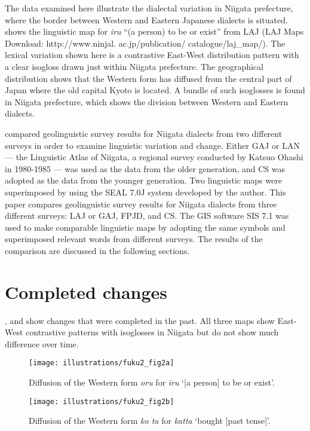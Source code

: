 \documentclass[output=paper]{LSP/langsci}
\begin{document}
The data examined here illustrate the dialectal variation in Niigata prefecture, where the border between Western and Eastern Japanese dialects is situated.   shows the linguistic map for \textit{iru} “(a person) to be or exist” from LAJ (LAJ Maps Download: http://www.ninjal. ac.jp/publication/ catalogue/laj\_map/).  The lexical variation shown here is a contrastive East-West distribution pattern with a clear isogloss drawn just within Niigata prefecture.  The geographical distribution shows that the Western form has diffused from the central part of Japan where the old capital Kyoto is located.  A bundle of such isoglosses is found in Niigata prefecture, which shows the division between Western and Eastern dialects.

\citet{fukushima_superimposing_2007} compared geolinguistic survey results for Niigata dialects from two different surveys in order to examine linguistic variation and change.  Either GAJ or LAN --- the Linguistic Atlas of Niigata, a regional survey conducted by Katsuo Ohashi in 1980-1985 \citep{ohashi_linguistic_1998} --- was used as the data from the older generation, and CS was adopted as the data from the younger generation.  Two linguistic maps were superimposed by using the SEAL 7.0J system developed by the author.  This paper compares geolinguistic survey results for Niigata dialects from three different surveys: LAJ or GAJ, FPJD, and CS.  The GIS software SIS 7.1 was used to make comparable linguistic maps by adopting the same symbols and superimposed relevant words from different surveys.  The results of the comparison are discussed in the following sections.

\section{Completed changes}

,  and  show changes that were completed in the past.  All three maps show East-West contrastive patterns with isoglosses in Niigata but do not show much difference over time.

\begin{figure}
\texttt{[image: illustrations/fuku2\_fig2a]}
\caption{Diffusion of the Western form \textit{oru} for \textit{iru} `[a person] to be or exist'.}
\label{fig:2a}
\end{figure}

\begin{figure}
\texttt{[image: illustrations/fuku2\_fig2b]}
\caption{Diffusion of the Western form \textit{ko
ta} for \textit{katta} `bought [past tense]'.}
\label{fig:2b}
\end{figure}
\end{document}
